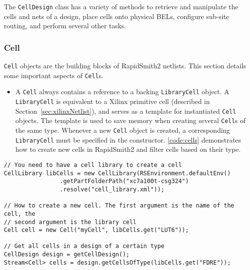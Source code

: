 \noindent
The \texttt{CellDesign} class has a variety of methods to retrieve and manipulate
the cells and nets of a design, place cells onto physical BELs, configure
sub-site routing, and perform several other tasks.
 
\subsubsection{Cell}
\texttt{Cell} objects are the building blocks of RapidSmith2 netlists. This
section details some important aspects of \texttt{Cell}s.

\begin {itemize}
  \item A \texttt{Cell} always contains a reference to a backing
  \texttt{LibraryCell} object. A \texttt{LibraryCell} is equivalent to a Xilinx
  primitive cell (described in Section~\ref{sec:xilinxNetlist}), and serves as a
  template for instantiated \texttt{Cell} objects. The template is used to save
  memory when creating several \texttt{Cell}s of the same type. Whenever a new
  \texttt{Cell} object is created, a corresponding \texttt{LibraryCell} must be
  specified in the constructor. \autoref{code:cells} demonstrates how to create
  new cells in RapidSmith2 and filter cells based on their type.
\end {itemize}  

\begin{lstlisting}[xleftmargin=1.5em, framexleftmargin=1.5em, caption=How to
create new cells in RapidSmith2, label=code:cells] 
// You need to have a cell library to create a cell
CellLibrary libCells = new CellLibrary(RSEnvironment.defaultEnv()
				.getPartFolderPath("xc7a100t-csg324")
				.resolve("cell_library.xml"));

// How to create a new cell. The first argument is the name of the cell, the
// second argument is the library cell
Cell cell = new Cell("myCell", libCells.get("LUT6"));

// Get all cells in a design of a certain type
CellDesign design = getCellDesign();
Stream<Cell> cells = design.getCellsOfType(libCells.get("FDRE"));
\end{lstlisting}

